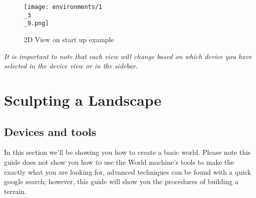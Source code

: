 \documentclass[../main.tex]{subfiles}
\begin{document}
\begin{figure}[H]
\texttt{[image: environments/1\\\_3\\\_9.png]}
\caption{2D View on start up example}
\end{figure}
\textit{It is important to note that each view will change based on which device you have selected in the device view or in the sidebar.}

\section{Sculpting a Landscape}
\subsection{Devices and tools}
In this section we’ll be showing you how to create a basic world. Please note this guide does not show you how to use the World machine’s tools to make the exactly what you are looking for, advanced techniques can be found with a quick google search; however, this guide will show you the procedures of building a terrain.
\end{document}
